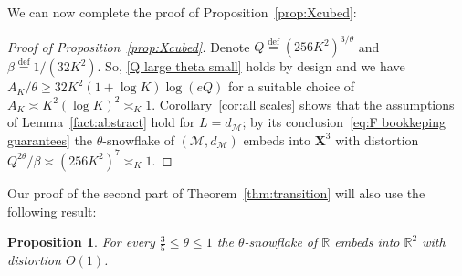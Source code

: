 \documentclass[11pt,reqno]{amsart}
\newtheorem{prop}[theorem]{Proposition}
\newcommand{\R}{\mathbb{R}}
\renewcommand{\le}{\leqslant}
\renewcommand{\ge}{\geqslant}
\newcommand{\eqdef}{\stackrel{\mathrm{def}}{=}}
\newcommand{\X}{\mathbf X}
\newcommand{\MM}{\mathcal{M}}
\newcommand{\1}{\mathbf{1}}
\begin{document}
We can now complete the proof of Proposition~\ref{prop:Xcubed}:

\begin{proof}[Proof of Proposition~\ref{prop:Xcubed}] Denote $Q\eqdef (256K^2)^{3/\theta}$ and $\beta\eqdef 1/(32K^2)$. So, \eqref{Q large theta small} holds by design and we have $A_K/\theta\ge 32K^2(1+\log K)\log(eQ)$ for a suitable choice of $A_K\asymp K^2(\log K)^2\asymp_K 1$. Corollary~\ref{cor:all scales} shows that the assumptions of Lemma~\ref{fact:abstract}  hold for $L=d_\MM$; by its conclusion~\eqref{eq:F bookkeping guarantees}   the $\theta$-snowflake of $(\MM,d_\MM)$ embeds into $\X^3$ with distortion $Q^{2\theta}/\beta\asymp (256K^2)^{7}\asymp_K 1$. 
\end{proof}

Our proof of the second part of Theorem~\ref{thm:transition} will also use the following result:




\begin{prop}\label{prop:R2}
For every $\frac35\le \theta \le 1$ the $\theta$-snowflake of $\R$ embeds into $\R^2$ with distortion $O(1)$. 
\end{prop}
\end{document}
